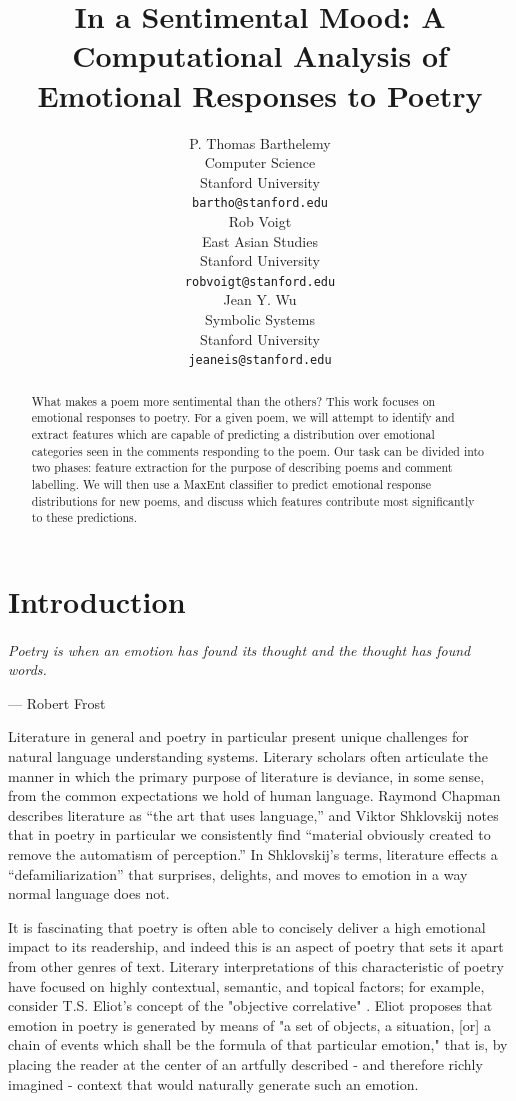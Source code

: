 \documentclass[11pt]{article}
\title{In a Sentimental Mood: A Computational Analysis of Emotional Responses to Poetry}
\author{P. Thomas Barthelemy \\
  Computer Science\\
  Stanford University \\
  {\tt bartho@stanford.edu} \\\And
  Rob Voigt \\
  East Asian Studies \\
  Stanford University \\
  {\tt robvoigt@stanford.edu} \\\And
  Jean Y. Wu \\
  Symbolic Systems  \\
  Stanford University\\
  {\tt jeaneis@stanford.edu} \\}
\date{}
\begin{document}
\maketitle
\begin{abstract}
What makes a poem more sentimental than the others? 
This work focuses on emotional responses to poetry. For a given poem, we will attempt to identify and extract features which are capable of predicting a distribution over emotional categories seen in the comments responding to the poem. Our task can be divided into two phases: feature extraction for the purpose of describing poems and comment labelling. We will then use a MaxEnt classifier to predict emotional response distributions for new poems, and discuss which features contribute most significantly to these predictions.
\end{abstract}

\section{Introduction}

\paragraph{}
\emph{Poetry is when an emotion has found its thought and the thought has found words.}
\begin{flushright}
--- Robert Frost\\
\end{flushright}


Literature in general and poetry in particular present unique challenges for natural language understanding systems. Literary scholars often articulate the manner in which the primary purpose of literature is deviance, in some sense, from the common expectations we hold of human language. Raymond Chapman describes literature as ``the art that uses language,'' and Viktor Shklovskij notes that in poetry in particular we consistently find ``material obviously created to remove the automatism of perception.'' In Shklovskij's terms, literature effects a ``defamiliarization'' that surprises, delights, and moves to emotion in a way normal language does not.

It is fascinating that poetry is often able to concisely deliver a high emotional impact to its readership, and indeed this is an aspect of poetry that sets it apart from other genres of text. Literary interpretations of this characteristic of poetry have focused on highly contextual, semantic, and topical factors; for example, consider T.S. Eliot's concept of the "objective correlative" \cite{eliot}. Eliot proposes that emotion in poetry is generated by means of "a set of objects, a situation, [or] a chain of events which shall be the formula of that particular emotion," that is, by placing the reader at the center of an artfully described - and therefore richly imagined - context that would naturally generate such an emotion.
\end{document}
